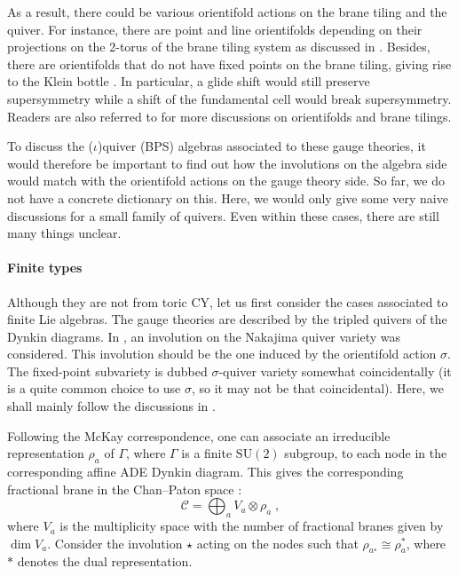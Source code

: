 \documentclass[11pt]{article}
\numberwithin{equation}{section}
\numberwithin{figure}{section}
\numberwithin{table}{section}
\newcommand{\SU}{\mathrm{SU}}
\begin{document}
As a result, there could be various orientifold actions on the brane tiling and the quiver. For instance, there are point and line orientifolds depending on their projections on the 2-torus of the brane tiling system as discussed in \cite{Franco:2007ii}. Besides, there are orientifolds that do not have fixed points on the brane tiling, giving rise to the Klein bottle \cite{Garcia-Valdecasas:2021znu}. In particular, a glide shift would still preserve supersymmetry while a shift of the fundamental cell would break supersymmetry. Readers are also referred to \cite{Argurio:2020npm,Argurio:2020dko} for more discussions on orientifolds and brane tilings.

To discuss the ($\iota$)quiver (BPS) algebras associated to these gauge theories, it would therefore be important to find out how the involutions on the algebra side would match with the orientifold actions on the gauge theory side. So far, we do not have a concrete dictionary on this. Here, we would only give some very naive discussions for a small family of quivers. Even within these cases, there are still many things unclear.

\paragraph{Finite types} Although they are not from toric CY, let us first consider the cases associated to finite Lie algebras. The gauge theories are described by the tripled quivers of the Dynkin diagrams. In \cite{li2018quiver}, an involution on the Nakajima quiver variety was considered. This involution should be the one induced by the orientifold action $\sigma$. The fixed-point subvariety is dubbed $\sigma$-quiver variety somewhat coincidentally (it is a quite common choice to use $\sigma$, so it may not be that coincidental). Here, we shall mainly follow the discussions in \cite[Section 3]{Nakajima:2025utt}.

Following the McKay correspondence, one can associate an irreducible representation $\rho_a$ of $\Gamma$, where $\Gamma$ is a finite $\SU(2)$ subgroup, to each node in the corresponding affine ADE Dynkin diagram. This gives the corresponding fractional brane in the Chan--Paton space \cite{Nakajima:1994nid,Douglas:1996sw,Diaconescu:1997br}:
\begin{equation}
	\mathcal{C}=\bigoplus_aV_a\otimes\rho_a\;,
\end{equation}
where $V_a$ is the multiplicity space with the number of fractional branes given by $\dim V_a$. Consider the involution $\star$ acting on the nodes such that $\rho_{a^\star}\cong\rho_a^*$, where $*$ denotes the dual representation.
\end{document}
